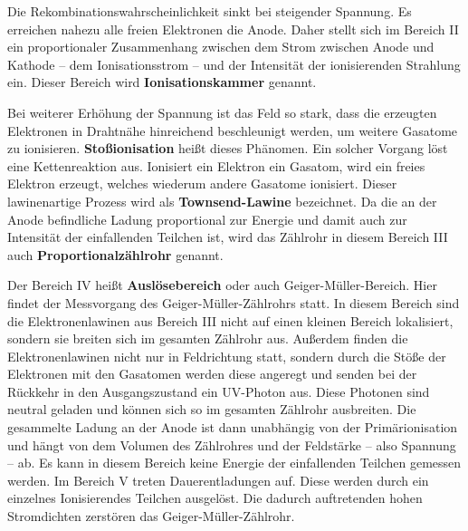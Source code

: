 Die Rekombinationswahrscheinlichkeit sinkt bei steigender Spannung. Es erreichen nahezu alle
freien Elektronen die Anode.
Daher stellt sich im Bereich II ein proportionaler Zusammenhang zwischen dem Strom zwischen
Anode und Kathode -- dem Ionisationsstrom -- und der Intensität der ionisierenden Strahlung ein.
Dieser Bereich wird \textbf{Ionisationskammer} genannt.

Bei weiterer Erhöhung der Spannung ist das Feld so stark, dass die erzeugten Elektronen
in Drahtnähe hinreichend beschleunigt werden, um weitere Gasatome zu ionisieren.
\textbf{Stoßionisation} heißt dieses Phänomen.
Ein solcher Vorgang löst eine Kettenreaktion aus. Ionisiert ein Elektron ein Gasatom,
wird ein freies Elektron erzeugt, welches wiederum andere Gasatome ionisiert.
Dieser lawinenartige Prozess wird als \textbf{Townsend-Lawine} bezeichnet.
Da die an der Anode befindliche Ladung proportional zur Energie und damit auch zur Intensität
der einfallenden Teilchen ist, wird das Zählrohr in diesem Bereich III auch
\textbf{Proportionalzählrohr} genannt.

Der Bereich IV heißt \textbf{Auslösebereich} oder auch Geiger-Müller-Bereich. Hier findet
der Messvorgang des Geiger-Müller-Zählrohrs statt.
In diesem Bereich sind die Elektronenlawinen aus Bereich III nicht auf einen kleinen Bereich
lokalisiert, sondern sie breiten sich im gesamten Zählrohr aus. Außerdem finden die
Elektronenlawinen nicht nur in Feldrichtung statt, sondern durch die Stöße der Elektronen mit
den Gasatomen werden diese angeregt und senden bei der Rückkehr in den Ausgangszustand
ein UV-Photon aus. Diese Photonen sind neutral geladen und können sich so im gesamten
Zählrohr ausbreiten.
Die gesammelte Ladung an der Anode ist dann unabhängig von der Primärionisation und hängt
von dem Volumen des Zählrohres und der Feldstärke -- also Spannung -- ab.
Es kann in diesem Bereich keine Energie der einfallenden Teilchen gemessen werden.
Im Bereich V treten Dauerentladungen auf. Diese werden durch ein einzelnes Ionisierendes Teilchen
ausgelöst. Die dadurch auftretenden hohen Stromdichten zerstören das Geiger-Müller-Zählrohr.
\FloatBarrier
